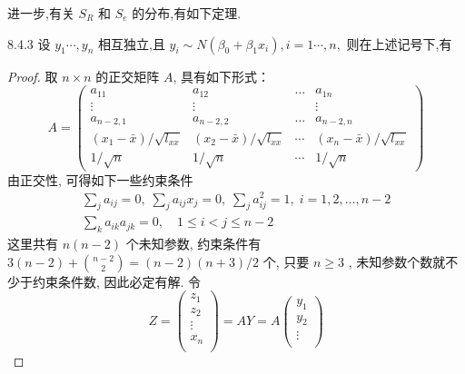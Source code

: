 进一步,有关 $S_R$ 和 $S_e$ 的分布,有如下定理.
\begin{theorem}{}{8.4.3}
设 $y_1\cdots,y_n$ 相互独立,且 $y_i\sim N(\beta_0+\beta_1x_i),i=1\cdots,n,$ 则在上述记号下,有
\end{theorem}
\begin{proof}
取 $n \times n$ 的正交矩阵 $A$, 具有如下形式：
\begin{equation}
A=\left(\begin{array}{cccc}{a_{11}} & {a_{12}} & {\dots} & {a_{1 n}} \\ {\vdots} & {\vdots} & {} & {\vdots} \\ {a_{n-2,1}} & {a_{n-2,2}} & {\dots} & {a_{n-2, n}} \\ {\left(x_{1}-\bar{x}\right) / \sqrt{l_{x x}}} & {\left(x_{2}-\bar{x}\right) / \sqrt{l_{x x}}} & {\cdots} & {\left(x_{n}-\bar{x}\right) / \sqrt{l_{x x}}} \\ {1 / \sqrt{n}} & {1 / \sqrt{n}} & {\cdots} & {1 / \sqrt{n}}\end{array}\right)
\end{equation}
由正交性, 可得如下一些约束条件
\begin{gather*}
\sum_{j} a_{i j}=0,\; \sum_{j} a_{i j} x_{j}=0,\;  \sum_{j} a_{i j}^{2}=1,\;  i = 1, 2, \ldots, n-2 \\ 
\sum_{k} a_{i k} a_{j k}=0, \quad 1 \leqslant i<j \leqslant n-2 
\end{gather*}
这里共有 $n(n-2)$ 个未知参数, 约束条件有 $ 3(n-2)+ = (n - 2)(n + 3)/2$ 个, 只要 $n $ , 未知参数个数就不少于约束条件数, 因此必定有解. 令
\begin{equation*}
Z=
\begin{pmatrix}
z_1\\
z_2\\
\vdots\\
x_n\\
\end{pmatrix}
=AY = A 
\begin{pmatrix}
y_1\\
y_2\\
\vdots\\

\end{pmatrix}
\end{equation*}
\end{proof}
